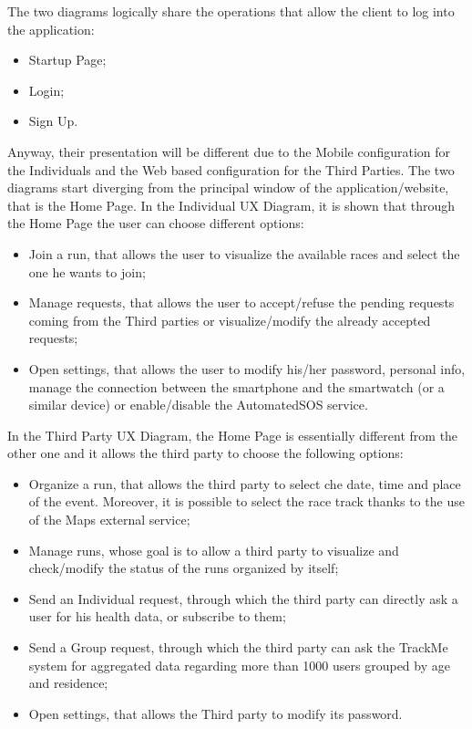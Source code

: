 The two diagrams logically share the operations that allow the client to log into the application: 
	\begin{itemize}
	\item Startup Page;
	\item Login;
	\item Sign Up.
	\end{itemize}
Anyway, their presentation will be different due to the Mobile configuration for the Individuals and the Web based configuration for the Third Parties.
The two diagrams start diverging from the principal window of the application/website, that is the Home Page.
In the Individual UX Diagram, it is shown that through the Home Page the user can choose different options:
	\begin{itemize}
	\item Join a run, that allows the user to visualize the available races and select the one he wants to join;
	\item Manage requests, that allows the user to accept/refuse the pending requests coming from the Third parties or visualize/modify the already accepted requests;
	\item Open settings, that allows the user to modify his/her password, personal info, manage the connection between the smartphone and the smartwatch (or a similar device) or enable/disable the AutomatedSOS service.\\ 
	\end{itemize}
In the Third Party UX Diagram, the Home Page is essentially different from the other one and it allows the third party to choose the following options:
	\begin{itemize}
	\item Organize a run, that allows the third party to select che date, time and place of the event. Moreover, it is possible to select the race track thanks to the use of the Maps external service;
	\item Manage runs, whose goal is to allow a third party to visualize and check/modify the status of the runs organized by itself;
	\item Send an Individual request, through which the third party can directly ask a user for his health data, or subscribe to them;
	\item Send a Group request, through which the third party can ask the TrackMe system for aggregated data regarding more than 1000 users grouped by age and residence;
	\item Open settings, that allows the Third party to modify its password.\\
	\end{itemize}

